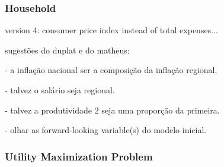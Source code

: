 \documentclass[../thesis.tex]{subfiles}
\begin{document}
\newpage




\subsubsection{Household}

\begin{tcolorbox}[colback=cyan!5!white,colframe=cyan!75!black]
	
	version 4: consumer price index instead of total expenses...
	
	sugestões do duplat e do matheus:
	
	- a inflação nacional ser a composição da inflação regional.
	
	- talvez o salário seja regional.
	
	- talvez a produtividade 2 seja uma proporção da primeira.
	
	- olhar as forward-looking variable(s) do modelo inicial.
	
\end{tcolorbox}

\subsubsection*{Utility Maximization Problem}
\end{document}
